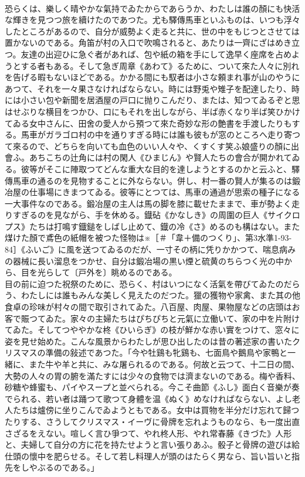 \documentclass[8pt]{extreport}
\begin{document}
\begin{CJK}{UTF8}{min}
\\	恐らくは、樂しく晴やかな氣持でゐたからであらうか、わたしは誰の顏にも快活な輝きを見つつ旅を續けたのであつた。尤も驛傳馬車といふものは、いつも浮々したところがあるので、自分が威勢よく走ると共に、世の中をもじつとさせては置かないのである。角笛が村の入口で吹鳴されると、あたりは一齊にざはめき立つ。友達の出迎ひに急ぐ者があれば、包や紙の箱を手にして逸早く座席を占めようとする者もある。そして急ぎ周章《あわて》るために、ついて來た人々に別れを告げる暇もないほどである。かかる間にも馭者は小さな頼まれ事が山のやうにあつて、それを一々果さなければならない。時には野兎や雉子を配達したり、時には小さい包や新聞を居酒屋の戸口に抛りこんだり、または、知つてゐるぞと思はせぶりな横目をつかひ、口にもそれを出しながら、半ば赤くなり半ば笑ひかけてゐる女中さんに、田舍の愛人から預つて來た奇妙な形の艶書を手渡したりもする。馬車がガラゴロ村の中を通りすぎる時には誰も彼もが窓のところへ走り寄つて來るので、どちらを向いても血色のいい人々や、くすくす笑ふ娘盛りの顏に出會ふ。あちこちの辻角には村の閑人《ひまじん》や賢人たちの會合が開かれてゐる。彼等がそこに陣取つてどんな重大な目的を達しようとするのかと云ふと、驛傳馬車の通るのを見物することに外ならない。併し、村一番の賢人が集るのは鍛冶屋の仕事場にきまつてゐる。彼等にとつては、馬車の通過が思索の種子になる一大事件なのである。鍛冶屋の主人は馬の脚を膝に載せたままで、車が勢よく走りすぎるのを見ながら、手を休める。鐡砧《かなしき》の周圍の巨人《サイクロプス》たちは打鳴す鐡鎚をしばし止めて、鐡の冷《さ》めるのも構はない。また煤けた顏で鳶色の紙帽を被つた怪物は※［＃「韋＋備のつくり」、第3水準1-93-84］《ふいご》に風を送つてゐるのだが、一寸その柄に凭りかかつて、喘息病みの器械に長い溜息をつかせ、自分は鍛冶場の黒い煙と硫黄のちらつく光の中から、目を光らして〔戸外を〕眺めるのである。
\\	目の前に迫つた祝祭のために、恐らく、村はいつになく活氣を帶びてゐたのだらう、わたしには誰もみんな美しく見えたのだつた。獵の獲物や家禽、また其の他食卓の珍味が村々の間で取引されてゐた。八百屋、肉屋、果物屋などの店頭はお客で賑つてゐた。家々の主婦たちはぴちぴちと元氣に立働いて、家の中を片附けてゐた。そしてつややかな柊《ひいらぎ》の枝が鮮かな赤い實をつけて、窓々に姿を見せ始めた。こんな風景からわたしが思ひ出したのは昔の著述家の書いたクリスマスの準備の敍述であつた。「今や牡鷄も牝鷄も、七面鳥や鵝鳥や家鴨と一緒に、また牛や羊と共に、みな屠られるのである。何故と云つて、十二日の間、大勢の人々の胃の腑を滿たすには少々の食物では濟まないのである。梅や香料、砂糖や蜂蜜も、パイやスープと並べられる。今こそ曲節《ふし》面白く音樂が奏でられる、若い者は踊つて歌つて身體を温《ぬく》めなければならない、よし老人たちは爐傍に坐りこんでゐようともである。女中は買物を半分だけ忘れて歸つたりする、さうしてクリスマス・イーヴに骨牌を忘れようものなら、も一度出直さざるをえない。喧しく言ひ爭つて、やれ柊人形、やれ常春藤《きづた》人形と、夫婦して自分の方に花を持たせようと言い張りあふ。骰子と骨牌の遊びは給仕頭の懷中を肥らせる。そして若し料理人が頭のはたらく男なら、旨い旨いと指先をしやぶるのである。」

\end{CJK}
\end{document}

